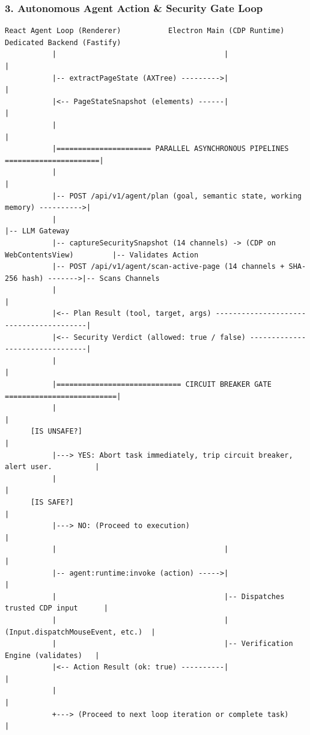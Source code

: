 \documentclass[11pt,a4paper]{article}
\begin{document}
\subsubsection{3. Autonomous Agent Action \& Security Gate Loop}
\begin{lstlisting}
React Agent Loop (Renderer)           Electron Main (CDP Runtime)           Dedicated Backend (Fastify)
           |                                       |                                     |
           |-- extractPageState (AXTree) --------->|                                     |
           |<-- PageStateSnapshot (elements) ------|                                     |
           |                                                                             |
           |====================== PARALLEL ASYNCHRONOUS PIPELINES ======================|
           |                                                                             |
           |-- POST /api/v1/agent/plan (goal, semantic state, working memory) ---------->|
           |                                                                             |-- LLM Gateway
           |-- captureSecuritySnapshot (14 channels) -> (CDP on WebContentsView)         |-- Validates Action
           |-- POST /api/v1/agent/scan-active-page (14 channels + SHA-256 hash) ------->|-- Scans Channels
           |                                                                             |
           |<-- Plan Result (tool, target, args) ----------------------------------------|
           |<-- Security Verdict (allowed: true / false) --------------------------------|
           |                                                                             |
           |============================= CIRCUIT BREAKER GATE ==========================|
           |                                                                             |
      [IS UNSAFE?]                                                                       |
           |---> YES: Abort task immediately, trip circuit breaker, alert user.          |
           |                                                                             |
      [IS SAFE?]                                                                         |
           |---> NO: (Proceed to execution)                                              |
           |                                       |                                     |
           |-- agent:runtime:invoke (action) ----->|                                     |
           |                                       |-- Dispatches trusted CDP input      |
           |                                       |   (Input.dispatchMouseEvent, etc.)  |
           |                                       |-- Verification Engine (validates)   |
           |<-- Action Result (ok: true) ----------|                                     |
           |                                                                             |
           +---> (Proceed to next loop iteration or complete task)                       |
\end{lstlisting}
\end{document}
